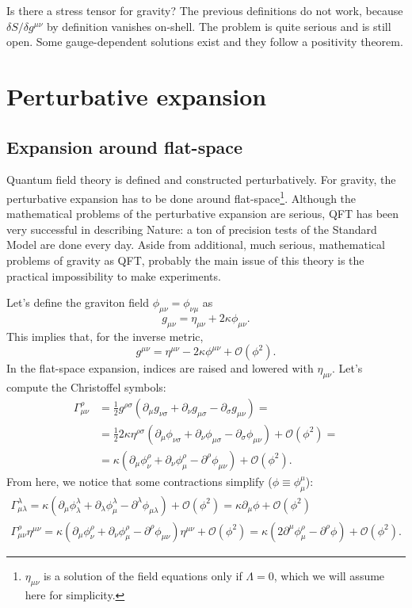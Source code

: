 \documentclass[a4paper,12pt]{book}
\begin{document}
Is there a stress tensor for gravity? The previous definitions do not work, because $\delta S/\delta g^{\mu\nu}$ by definition vanishes on-shell. The problem is quite serious and is still open. Some gauge-dependent solutions exist and they follow a positivity theorem.

\chapter{Perturbative expansion}
\section{Expansion around flat-space}
Quantum field theory is defined and constructed perturbatively. For gravity, the perturbative expansion has to be done around flat-space\footnote{$\eta_{\mu\nu}$ is a solution of the field equations only if $\Lambda=0$, which we will assume here for simplicity.}. Although the mathematical problems of the perturbative expansion are serious, QFT has been very successful in describing Nature: a ton of precision tests of the Standard Model are done every day. Aside from additional, much serious, mathematical problems of gravity as QFT, probably the main issue of this theory is the practical impossibility to make experiments.

Let's define the graviton field $\phi_{\mu\nu}=\phi_{\nu\mu}$ as
\[g_{\mu\nu}=\eta_{\mu\nu}+2\kappa\phi_{\mu\nu}.\]
This implies that, for the inverse metric,
\[g^{\mu\nu}=\eta^{\mu\nu}-2\kappa\phi^{\mu\nu}+\mathcal O(\phi^2).\]
In the flat-space expansion, indices are raised and lowered with $\eta_{\mu\nu}$. Let's compute the Christoffel symbols:
\begin{align*}
\Gamma^\rho_{\mu\nu}&=\frac12g^{\rho\sigma}(\partial_\mu g_{\nu\sigma}+\partial_\nu g_{\mu\sigma}-\partial_\sigma g_{\mu\nu})=\\
&=\frac122\kappa\eta^{\rho\sigma}(\partial_\mu\phi_{\nu\sigma}+\partial_\nu\phi_{\mu\sigma}-\partial_\sigma\phi_{\mu\nu})+\mathcal O(\phi^2)=\\
&=\kappa(\partial_\mu\phi^\rho_\nu+\partial_\nu\phi^\rho_\mu-\partial^\rho\phi_{\mu\nu})+\mathcal O(\phi^2).
\end{align*}
From here, we notice that some contractions simplify ($\phi\equiv \phi^\mu_\mu$):
\begin{gather*}
\Gamma^\lambda_{\mu\lambda}=\kappa(\partial_\mu\phi^\lambda_\lambda+\partial_\lambda\phi^\lambda_\mu-\partial^\lambda\phi_{\mu\lambda})+\mathcal O(\phi^2)=\kappa\partial_\mu\phi+\mathcal O(\phi^2)\\
\Gamma^\rho_{\mu\nu}\eta^{\mu\nu}=\kappa(\partial_\mu\phi^\rho_\nu+\partial_\nu\phi^\rho_\mu-\partial^\rho\phi_{\mu\nu})\eta^{\mu\nu}+\mathcal O(\phi^2)=\kappa(2\partial^\mu\phi^\rho_\mu-\partial^\rho\phi)+\mathcal O(\phi^2).
\end{gather*}
\end{document}
